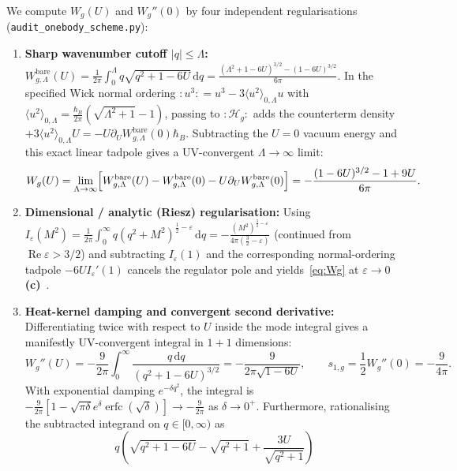 \documentclass[11pt,a4paper]{article}
\newcommand{\Lc}{\textbf{(c)}\ }
\newcommand{\dd}{\mathrm d}
\newcommand{\scr}{\texttt{audit\_\allowbreak onebody\_\allowbreak scheme.py}}
\begin{document}
We compute $W_g(U)$ and $W_g''(0)$ by four independent regularisations (\scr):
\begin{enumerate}
  \item \textbf{Sharp wavenumber cutoff $|q|\le\Lambda$:}
  $W_{g,\Lambda}^{\mathrm{bare}}(U) = \frac{1}{2\pi}\int_0^\Lambda q\sqrt{q^2+1-6U}\,\dd q
  = \frac{(\Lambda^2+1-6U)^{3/2} - (1-6U)^{3/2}}{6\pi}$.
  In the specified Wick normal ordering $:\!u^3\!: = u^3 - 3\langle u^2\rangle_{0,\Lambda}u$
  with $\langle u^2\rangle_{0,\Lambda} = \frac{\hbar_B}{2\pi}(\sqrt{\Lambda^2+1}-1)$,
  passing to $:\!\mathcal{H}_g\!:$ adds the counterterm density
  $+3\langle u^2\rangle_{0,\Lambda}U = -U\partial_U W_{g,\Lambda}^{\mathrm{bare}}(0)\hbar_B$.
  Subtracting the $U=0$ vacuum energy and this exact linear tadpole gives a UV-convergent
  $\Lambda\to\infty$ limit:
  \begin{equation}
    W_g(U) = \lim_{\Lambda\to\infty}\Bigl[
      W_{g,\Lambda}^{\mathrm{bare}}(U) - W_{g,\Lambda}^{\mathrm{bare}}(0)
      - U\partial_U W_{g,\Lambda}^{\mathrm{bare}}(0)
    \Bigr]
    = -\frac{(1-6U)^{3/2} - 1 + 9U}{6\pi}.
    \label{eq:Wg}
  \end{equation}
  \item \textbf{Dimensional / analytic (Riesz) regularisation:}
  Using $I_\varepsilon(M^2) = \frac{1}{2\pi}\int_0^\infty q(q^2+M^2)^{\frac{1}{2}-\varepsilon}\,\dd q
  = -\frac{(M^2)^{\frac{3}{2}-\varepsilon}}{4\pi(\frac{3}{2}-\varepsilon)}$ (continued from
  $\operatorname{Re}\varepsilon > 3/2$) and subtracting $I_\varepsilon(1)$ and the corresponding
  normal-ordering tadpole $-6U I_\varepsilon'(1)$ cancels the regulator pole and yields~\eqref{eq:Wg}
  at $\varepsilon\to 0$ \Lc.
  \item \textbf{Heat-kernel damping and convergent second derivative:}
  Differentiating twice with respect to $U$ inside the mode integral gives a
  manifestly UV-convergent integral in $1+1$ dimensions:
  \begin{equation}
    W_g''(U) = -\frac{9}{2\pi}\int_0^\infty\frac{q\,\dd q}{(q^2+1-6U)^{3/2}}
    = -\frac{9}{2\pi\sqrt{1-6U}},
    \qquad
    s_{1,g} = \frac{1}{2}W_g''(0) = -\frac{9}{4\pi}.
    \label{eq:s1g}
  \end{equation}
  With exponential damping $e^{-\delta q^2}$, the integral is
  $-\frac{9}{2\pi}[1 - \sqrt{\pi\delta}e^\delta\operatorname{erfc}(\sqrt{\delta})] \to -\frac{9}{2\pi}$
  as $\delta\to 0^+$. Furthermore, rationalising the subtracted integrand on $q\in[0,\infty)$ as
  \begin{equation}
    q\left(\sqrt{q^2+1-6U} - \sqrt{q^2+1} + \frac{3U}{\sqrt{q^2+1}}\right)

\end{equation}
\end{enumerate}
\end{document}

